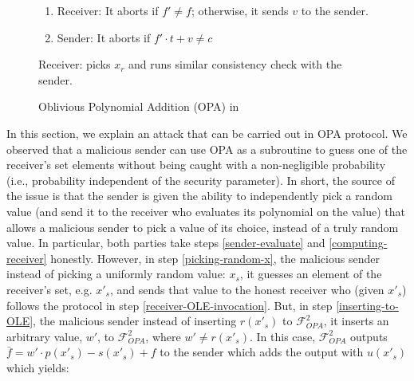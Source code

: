 \begin{figure}[ht]
\begin{center}
\begin{boxedminipage}{12.3cm}
\begin{enumerate}
{\begin{enumerate}
\item\label{receiver-check} Receiver: It aborts if $f'\neq f$; otherwise, it sends $v$ to the sender. 
\item Sender: It aborts if $f'\cdot t+v\neq c$
\end{enumerate}
\item Receiver: picks $x_{\scriptscriptstyle r}$ and runs similar consistency check with the sender. 
}
\end{enumerate}
\end{boxedminipage}
\end{center}
\caption{Oblivious Polynomial Addition (OPA)  in \cite{GhoshN19}} 
\label{fig:OPA}
\end{figure}


In this section, we explain an attack that can be carried out in OPA protocol. We observed that a malicious sender can use OPA as a subroutine to guess one of the receiver's set elements without being caught with a non-negligible probability (i.e.,  probability  independent of the security parameter). In short,  the source of the issue is that the sender is given the ability to independently pick a random value (and send it to the receiver who evaluates its polynomial on the value) that allows a malicious sender to pick a value of its choice, instead of a truly random value.  In particular, both parties take steps \ref{sender-evaluate} and \ref{computing-receiver} honestly. However, in step \ref{picking-random-x}, the malicious sender instead of picking a uniformly random value: $x_{\scriptscriptstyle s}$, it  guesses an element of the receiver's set, e.g. $x'_{\scriptscriptstyle s}$, and sends that value to the  honest receiver who (given  $x'_{\scriptscriptstyle s}$) follows the protocol in step \ref{receiver-OLE-invocation}.   But, in step \ref{inserting-to-OLE}, the malicious sender instead of inserting $r(x'_{\scriptscriptstyle s})$ to $\mathcal{F}_{\scriptscriptstyle OPA}^{\scriptscriptstyle 2}$, it inserts an arbitrary value, $w'$, to $\mathcal{F}_{\scriptscriptstyle OPA}^{\scriptscriptstyle 2}$, where $w'\neq r(x'_{\scriptscriptstyle s})$. In this case, $\mathcal{F}_{\scriptscriptstyle OPA}^{\scriptscriptstyle 2}$ outputs $\bar{f}= w'\cdot p(x'_{\scriptscriptstyle s})-s(x'_{\scriptscriptstyle s})+f$ to the sender which adds the output  with $u(x'_{\scriptscriptstyle s})$ which yields:

